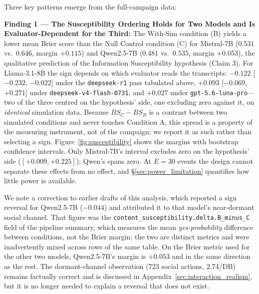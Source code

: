 \documentclass[11pt,journal,onecolumn]{IEEEtran}
\begin{document}
Three key patterns emerge from the full-campaign data:

\textbf{Finding 1 --- The Susceptibility Ordering Holds for Two Models and Is Evaluator-Dependent for the Third:} The With-Sim condition (B) yields a lower mean Brier score than the Null Control condition (C) for Mistral-7B ($0.531$ vs.\ $0.646$, margin $+0.115$) and Qwen2.5-7B ($0.481$ vs.\ $0.535$, margin $+0.053$), the qualitative prediction of the Information Susceptibility hypothesis (Claim 3). For Llama-3.1-8B the sign depends on which evaluator reads the transcripts: $-0.122$ [$-0.232$, $-0.022$] under the \texttt{deepseek-r1} pass tabulated above, $+0.093$ [$-0.069$, $+0.271$] under \texttt{deepseek-v4-flash-0731}, and $+0.027$ under \texttt{gpt-5.6-luna-pro}---two of the three centred on the hypothesis' side, one excluding zero against it, on \emph{identical} simulation data. Because $BS_C - BS_B$ is a contrast between two simulated conditions and never touches Condition A, this spread is a property of the measuring instrument, not of the campaign; we report it as such rather than selecting a sign. Figure~\ref{fig:susceptibility} shows the margins with bootstrap confidence intervals. Only Mistral-7B's interval excludes zero on the hypothesis' side ($[+0.009, +0.225]$); Qwen's spans zero. At $E=30$ events the design cannot separate these effects from no effect, and \S\ref{sec:power_limitation} quantifies how little power is available.

We note a correction to earlier drafts of this analysis, which reported a sign reversal for Qwen2.5-7B ($-0.044$) and attributed it to that model's near-dormant social channel. That figure was the \texttt{content\_susceptibility.delta.B\_minus\_C} field of the pipeline summary, which measures the mean \emph{yes-probability} difference between conditions, not the Brier margin; the two are distinct metrics and were inadvertently mixed across rows of the same table. On the Brier metric used for the other two models, Qwen2.5-7B's margin is $+0.053$ and in the same direction as the rest. The dormant-channel observation (723 social actions, 2.74/DB) remains factually correct and is discussed in Appendix~\ref{sec:interaction_realism}, but it is no longer needed to explain a reversal that does not exist.
\end{document}
